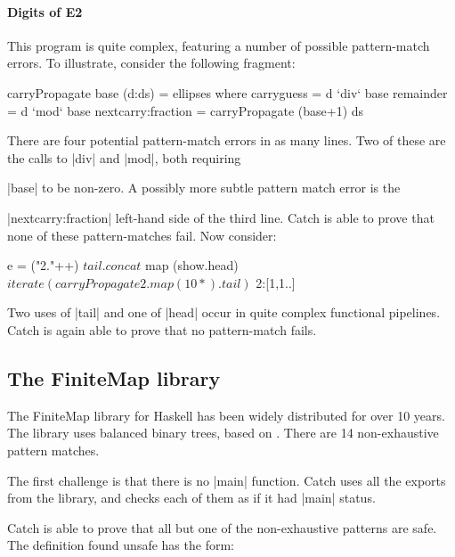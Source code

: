 \documentclass[preprint]{sigplanconf}
\begin{document}
\paragraph{Digits of E2}

This program is quite complex, featuring a number of possible pattern-match errors. To illustrate, consider the following fragment:

\begin{code}
carryPropagate base (d:ds) = ellipses
  where  carryguess = d `div` base
         remainder = d `mod` base
         nextcarry:fraction = carryPropagate (base+1) ds
\end{code}

\noindent There are four potential pattern-match errors in as many lines. Two of these are the calls to |div| and |mod|, both requiring \ignore|base| to be non-zero. A possibly more subtle pattern match error is the \ignore|nextcarry:fraction| left-hand side of the third line. Catch is able to prove that none of these pattern-matches fail. Now consider:

\begin{code}
e =  ("2."++) $
     tail . concat $
     map (show.head) $
     iterate (carryPropagate 2 . map (10*) . tail) $
     2:[1,1..]
\end{code}

\noindent Two uses of |tail| and one of |head| occur in quite complex functional pipelines. Catch is again able to prove that no pattern-match fails.

\subsection{The FiniteMap library}
\label{sec:finitemap}

The FiniteMap library for Haskell has been widely distributed for over 10 years. The library uses balanced binary trees, based on \cite{adams:sets}. There are 14 non-exhaustive pattern matches.

The first challenge is that there is no |main| function. Catch uses all the exports from the library, and checks each of them as if it had |main| status.

Catch is able to prove that all but one of the non-exhaustive patterns are safe. The definition found unsafe has the form:

\begin{comment}
\begin{code}
data Branch a b = Branch a b
\end{code}
\end{comment}
\end{document}
